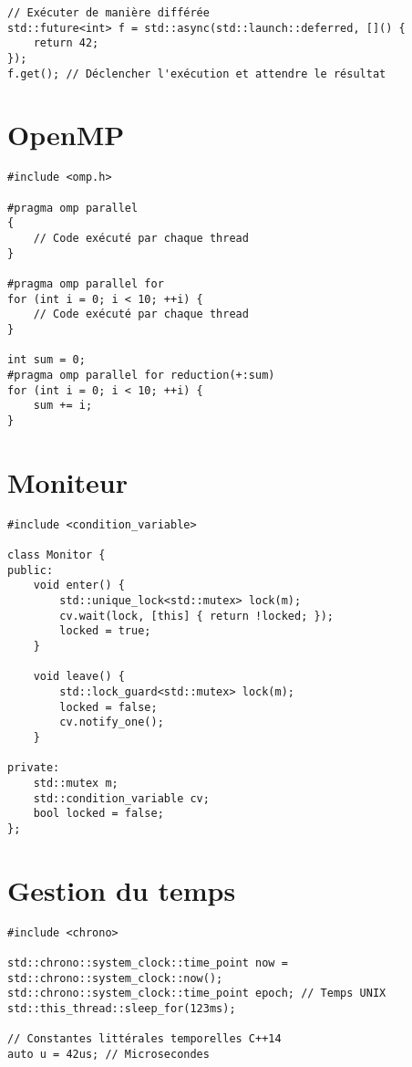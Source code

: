 \documentclass{article}
\begin{document}
\begin{multicols*}{3}
\begin{lstlisting}
// Exécuter de manière différée
std::future<int> f = std::async(std::launch::deferred, []() {
    return 42;
});
f.get(); // Déclencher l'exécution et attendre le résultat
\end{lstlisting}

\section*{OpenMP}

\begin{lstlisting}
#include <omp.h>

#pragma omp parallel
{
    // Code exécuté par chaque thread
}

#pragma omp parallel for
for (int i = 0; i < 10; ++i) {
    // Code exécuté par chaque thread
}

int sum = 0;
#pragma omp parallel for reduction(+:sum)
for (int i = 0; i < 10; ++i) {
    sum += i;
}

\end{lstlisting}

\section*{Moniteur}

\begin{lstlisting}
#include <condition_variable>

class Monitor {
public:
    void enter() {
        std::unique_lock<std::mutex> lock(m);
        cv.wait(lock, [this] { return !locked; });
        locked = true;
    }

    void leave() {
        std::lock_guard<std::mutex> lock(m);
        locked = false;
        cv.notify_one();
    }

private:
    std::mutex m;
    std::condition_variable cv;
    bool locked = false;
};
\end{lstlisting}

\section*{Gestion du temps}

\begin{lstlisting}
#include <chrono>

std::chrono::system_clock::time_point now = std::chrono::system_clock::now();
std::chrono::system_clock::time_point epoch; // Temps UNIX
std::this_thread::sleep_for(123ms);

// Constantes littérales temporelles C++14
auto u = 42us; // Microsecondes
\end{lstlisting}


\end{multicols*}
\end{document}
